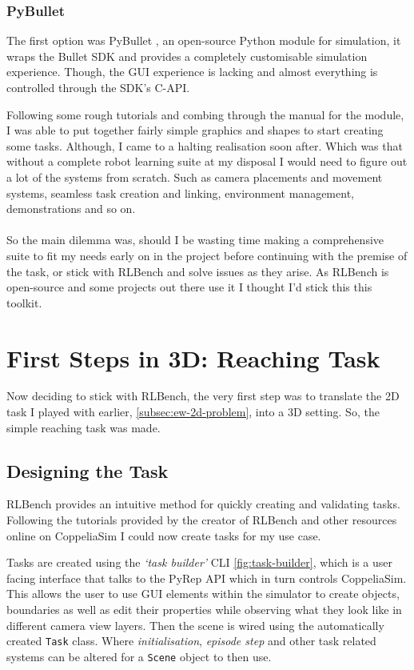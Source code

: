 \subsubsection{PyBullet}
The first option was PyBullet \cite{pybullet}, an open-source Python module for simulation, it wraps the Bullet SDK \cite{bullet3} and provides a completely customisable simulation experience. Though, the GUI experience is lacking and almost everything is controlled through the SDK's C-API.

Following some rough tutorials and combing through the manual for the module, I was able to put together fairly simple graphics and shapes to start creating some tasks. Although, I came to a halting realisation soon after. Which was that without a complete robot learning suite at my disposal I would need to figure out a lot of the systems from scratch. Such as camera placements and movement systems, seamless task creation and linking, environment management, demonstrations and so on.
\\\\
So the main dilemma was, should I be wasting time making a comprehensive suite to fit my needs early on in the project before  continuing with the premise of the task, or stick with RLBench and solve issues as they arise. As RLBench is open-source and some projects out there use it I thought I'd stick this this toolkit.

\section{First Steps in 3D: Reaching Task}\label{sec:3d-reaching-tasks}
Now deciding to stick with RLBench, the very first step was to translate the 2D task I played with earlier, \ref{subsec:ew-2d-problem}, into a 3D setting. So, the simple reaching task was made. 

\subsection{Designing the Task}
RLBench provides an intuitive method for quickly creating and validating tasks. Following the tutorials provided by the creator of RLBench and other resources online on CoppeliaSim  I could now create tasks for my use case.

Tasks are created using the \emph{`task builder'} CLI \ref{fig:task-builder}, which is a user facing interface that talks to the PyRep API which in turn controls CoppeliaSim. This allows the user to use GUI elements within the simulator to create objects, boundaries as well as edit their properties while observing what they look like in different camera view layers. Then the scene is wired using the automatically created \verb|Task| class. Where \emph{initialisation}, \emph{episode step} and other task related systems can be altered for a \verb|Scene| object to then use.

